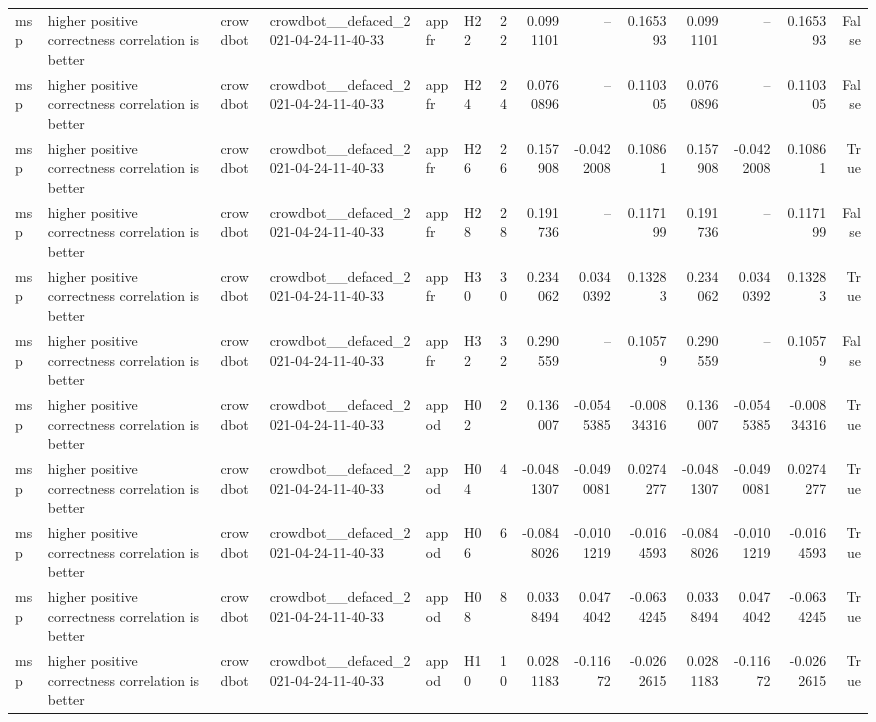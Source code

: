 \begin{longtable}{llllllrrrrrrrr}
msp & higher positive correctness correlation is better & crowdbot & crowdbot\_\_defaced\_2021-04-24-11-40-33 & appfr & H22 & 22 & 0.0991101 & -- & 0.165393 & 0.0991101 & -- & 0.165393 & False \\
msp & higher positive correctness correlation is better & crowdbot & crowdbot\_\_defaced\_2021-04-24-11-40-33 & appfr & H24 & 24 & 0.0760896 & -- & 0.110305 & 0.0760896 & -- & 0.110305 & False \\
msp & higher positive correctness correlation is better & crowdbot & crowdbot\_\_defaced\_2021-04-24-11-40-33 & appfr & H26 & 26 & 0.157908 & -0.0422008 & 0.10861 & 0.157908 & -0.0422008 & 0.10861 & True \\
msp & higher positive correctness correlation is better & crowdbot & crowdbot\_\_defaced\_2021-04-24-11-40-33 & appfr & H28 & 28 & 0.191736 & -- & 0.117199 & 0.191736 & -- & 0.117199 & False \\
msp & higher positive correctness correlation is better & crowdbot & crowdbot\_\_defaced\_2021-04-24-11-40-33 & appfr & H30 & 30 & 0.234062 & 0.0340392 & 0.13283 & 0.234062 & 0.0340392 & 0.13283 & True \\
msp & higher positive correctness correlation is better & crowdbot & crowdbot\_\_defaced\_2021-04-24-11-40-33 & appfr & H32 & 32 & 0.290559 & -- & 0.10579 & 0.290559 & -- & 0.10579 & False \\
msp & higher positive correctness correlation is better & crowdbot & crowdbot\_\_defaced\_2021-04-24-11-40-33 & appod & H02 & 2 & 0.136007 & -0.0545385 & -0.00834316 & 0.136007 & -0.0545385 & -0.00834316 & True \\
msp & higher positive correctness correlation is better & crowdbot & crowdbot\_\_defaced\_2021-04-24-11-40-33 & appod & H04 & 4 & -0.0481307 & -0.0490081 & 0.0274277 & -0.0481307 & -0.0490081 & 0.0274277 & True \\
msp & higher positive correctness correlation is better & crowdbot & crowdbot\_\_defaced\_2021-04-24-11-40-33 & appod & H06 & 6 & -0.0848026 & -0.0101219 & -0.0164593 & -0.0848026 & -0.0101219 & -0.0164593 & True \\
msp & higher positive correctness correlation is better & crowdbot & crowdbot\_\_defaced\_2021-04-24-11-40-33 & appod & H08 & 8 & 0.0338494 & 0.0474042 & -0.0634245 & 0.0338494 & 0.0474042 & -0.0634245 & True \\
msp & higher positive correctness correlation is better & crowdbot & crowdbot\_\_defaced\_2021-04-24-11-40-33 & appod & H10 & 10 & 0.0281183 & -0.11672 & -0.0262615 & 0.0281183 & -0.11672 & -0.0262615 & True \\

\end{longtable}
